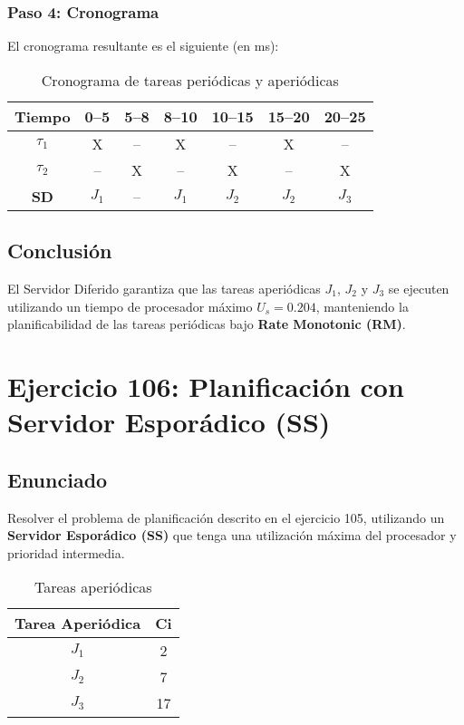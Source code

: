 \documentclass[a4paper,12pt]{article}
\begin{document}
\subsubsection{Paso 4: Cronograma}
El cronograma resultante es el siguiente (en ms):

\begin{table}[H]
    \centering
    \begin{tabular}{|c|c|c|c|c|c|c|}
    \hline
    \textbf{Tiempo} & 0--5 & 5--8 & 8--10 & 10--15 & 15--20 & 20--25 \\ \hline
    \textbf{\(\tau_1\)} & X & -- & X & -- & X & -- \\ \hline
    \textbf{\(\tau_2\)} & -- & X & -- & X & -- & X \\ \hline
    \textbf{SD} & \(J_1\) & -- & \(J_1\) & \(J_2\) & \(J_2\) & \(J_3\) \\ \hline
    \end{tabular}
    \caption{Cronograma de tareas periódicas y aperiódicas}
\end{table}

\subsection{Conclusión}
El Servidor Diferido garantiza que las tareas aperiódicas \(J_1\), \(J_2\) y \(J_3\) se ejecuten utilizando un tiempo de procesador máximo \(U_s = 0.204\), manteniendo la planificabilidad de las tareas periódicas bajo \textbf{Rate Monotonic (RM)}.

\section{Ejercicio 106: Planificación con Servidor Esporádico (SS)}
\subsection{Enunciado}
Resolver el problema de planificación descrito en el ejercicio 105, utilizando un \textbf{Servidor Esporádico (SS)} que tenga una utilización máxima del procesador y prioridad intermedia.

\begin{table}[H]
\centering
\begin{tabular}{|c|c|}
\hline
\textbf{Tarea Aperiódica} & \textbf{Ci} \\ \hline
$J_1$ & 2 \\ \hline
$J_2$ & 7 \\ \hline
$J_3$ & 17 \\ \hline
\end{tabular}
\caption{Tareas aperiódicas}
\end{table}
\end{document}
